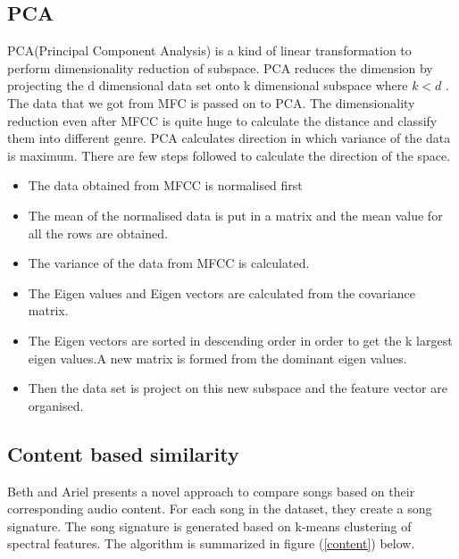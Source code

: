 \documentclass[12pt]{article}
\begin{document}
\subsection{PCA}
PCA(Principal Component Analysis) is a kind of linear transformation to perform dimensionality reduction of subspace. PCA reduces the dimension by projecting the d dimensional data set onto k dimensional subspace where $k<d$ \cite{holand}. The data that we got from MFC is passed on to PCA. The dimensionality reduction even after MFCC is quite huge to calculate the distance and classify them into different genre.
PCA calculates direction in which variance of the data is maximum. There are few steps followed to calculate the direction of the space.
\begin{itemize}
  \item The data obtained from MFCC is normalised first
  \item The mean of the normalised data is put in a matrix and the mean value for all the rows are obtained.
  \item The variance of the data from MFCC is calculated.
  \item The Eigen values and Eigen vectors are calculated from the covariance matrix.
  \item The Eigen vectors are sorted in descending order in order to get the k largest eigen values.A new matrix is formed from the dominant eigen values.
  \item Then the data set is project on this new subspace and the feature vector are organised.
\end{itemize}
\subsection{Content based similarity}
Beth and Ariel \cite{logan} presents a novel approach to compare songs based on their corresponding audio content. For each song in the dataset, they create a song signature. The song signature is generated based on k-means clustering of spectral features. The algorithm is summarized in figure (\ref{content}) below.
\end{document}
